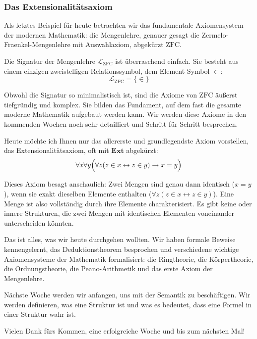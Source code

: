 \subsubsection{Das Extensionalitätsaxiom}

\begin{spoken-clean}[01:27:42 - 01:30:08]
Als letztes Beispiel für heute betrachten wir das fundamentale Axiomensystem der modernen Mathematik: die Mengenlehre, genauer gesagt die Zermelo-Fraenkel-Mengenlehre mit Auswahlaxiom, abgekürzt $\text{ZFC}$. 

Die Signatur der Mengenlehre $\mathcal{L}_{\text{ZFC}}$ ist überraschend einfach. Sie besteht aus einem einzigen zweistelligen Relationssymbol, dem Element-Symbol $\in$:
\[ \mathcal{L}_{\text{ZFC}} = \{\in\} \]

Obwohl die Signatur so minimalistisch ist, sind die Axiome von $\text{ZFC}$ äußerst tiefgründig und komplex. Sie bilden das Fundament, auf dem fast die gesamte moderne Mathematik aufgebaut werden kann. Wir werden diese Axiome in den kommenden Wochen noch sehr detailliert und Schritt für Schritt besprechen. 

Heute möchte ich Ihnen nur das allererste und grundlegendste Axiom vorstellen, das Extensionalitätsaxiom, oft mit $\mathbf{Ext}$ abgekürzt:
\[ \forall x \forall y \Bigl(\forall z (z \in x \leftrightarrow z \in y) \rightarrow x = y\Bigr) \]

Dieses Axiom besagt anschaulich: Zwei Mengen sind genau dann identisch ($x = y$), wenn sie exakt dieselben Elemente enthalten ($\forall z (z \in x \leftrightarrow z \in y)$). Eine Menge ist also vollständig durch ihre Elemente charakterisiert. Es gibt keine  oder innere Strukturen, die zwei Mengen mit identischen Elementen voneinander unterscheiden könnten. 

Das ist alles, was wir heute durchgehen wollten. Wir haben formale Beweise kennengelernt, das Deduktionstheorem besprochen und verschiedene wichtige Axiomensysteme der Mathematik formalisiert: die Ringtheorie, die Körpertheorie, die Ordnungstheorie, die Peano-Arithmetik und das erste Axiom der Mengenlehre. 

Nächste Woche werden wir anfangen, uns mit der Semantik zu beschäftigen. Wir werden definieren, was eine Struktur ist und was es bedeutet, dass eine Formel in einer Struktur wahr ist. 

Vielen Dank fürs Kommen, eine erfolgreiche Woche und bis zum nächsten Mal!
\end{spoken-clean}

